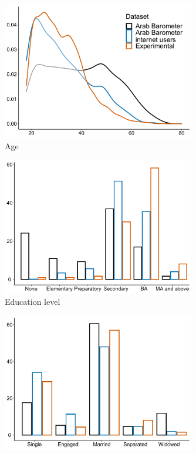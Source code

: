 \documentclass[12pt]{article}
\begin{document}
\begin{figure}[H]
\caption{Comparison of demographics between Arab Barometer and experimental sample respondents}
  \begin{subfigure}[b]{0.48\linewidth}
    \centering
    \includegraphics[height=6cm,width=8cm\linewidth]{Figures/AB/white/age.pdf} 
    \caption{Age} 
    \label{} 
  \end{subfigure} 
  \hspace{\fill}  
  \begin{subfigure}[b]{0.48\linewidth}
    \centering
    \includegraphics[height=6cm,width=8cm\linewidth]{Figures/AB/white/educ.pdf}
    \caption{Education level} 
    \label{} 
  \end{subfigure} 
  \begin{subfigure}[b]{0.48\linewidth}
    \centering
    \includegraphics[height=6cm,width=8cm\linewidth]{Figures/AB/white/married.pdf} 

\end{subfigure}
\end{figure}
\end{document}
